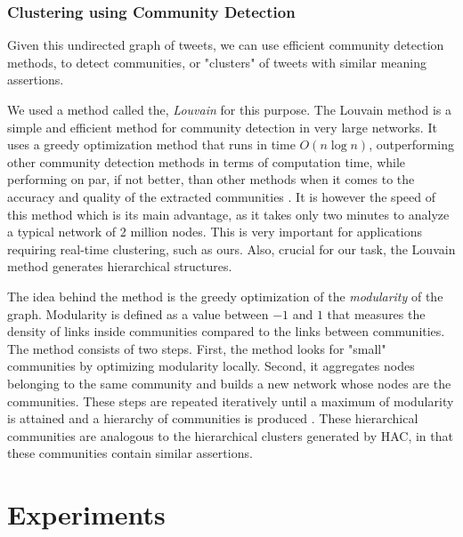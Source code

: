 \documentclass[letterpaper]{article}
\begin{document}
\subsubsection{Clustering using Community Detection}
Given this undirected graph of tweets, we can use efficient community detection methods, to detect communities, or "clusters" of tweets with similar meaning assertions. 

We used a method called the, \emph{Louvain} \cite{de2011generalized} for this purpose. The Louvain method is a simple and efficient method for community detection in very large networks. It uses a greedy optimization method that runs in time $O(n\log{}n)$, outperforming other community detection methods in terms of computation time, while  performing on par, if not better, than other methods when it comes to the accuracy and quality of the extracted communities \cite{aynaud2013multilevel}. It is however the speed of this method which is its main advantage, as it takes only two minutes to analyze a typical network of 2 million nodes. This is very important for applications requiring real-time clustering, such as ours. Also, crucial for our task, the Louvain method generates hierarchical structures. 

The idea behind the method is the greedy optimization of the \emph{modularity} of the graph. Modularity is defined as a value between $-1$ and $1$ that measures the density of links inside communities compared to the links between communities. The method consists of two steps. First, the method looks for "small" communities by optimizing modularity locally. Second, it aggregates nodes belonging to the same community and builds a new network whose nodes are the communities. These steps are repeated iteratively until a maximum of modularity is attained and a hierarchy of communities is produced \cite{de2011generalized}. These hierarchical communities are analogous to the hierarchical clusters generated by HAC, in that these communities contain similar assertions.
     


\section{Experiments}
\end{document}
